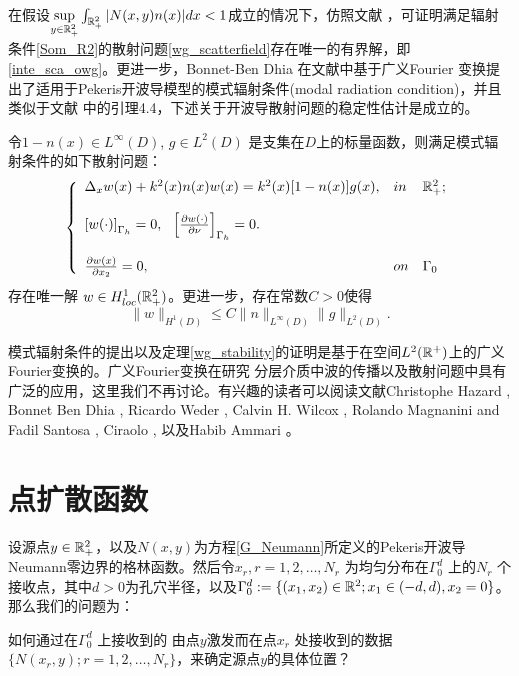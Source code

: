 在假设$\sup\limits_{y\in\mathbb{R}^2_+}\int_{\mathbb{R}^2_+}|N(x,y)n(x)|dx<1$成立的情况下，仿照文献\cite{Ciraolo2009A1,Ciraolo2009A2} ，可证明满足辐射条件\eqref{Som_R2}的散射问题\eqref{wg_scatterfield}存在唯一的有界解，即\eqref{inte_sca_owg}。更进一步，Bonnet-Ben Dhia 在文献\cite{Dhia2009DIFFRACTION}中基于广义Fourier 变换提出了适用于Pekeris开波导模型的模式辐射条件(modal radiation condition)，并且类似于文献\cite{Dhia2009DIFFRACTION} 中的引理4.4，下述关于开波导散射问题的稳定性估计是成立的。
\begin{theorem}\label{wg_stability}
令$1-n(x)\in L^{\infty}(D)$, $g\in L^2(D)$ 是支集在$D$上的标量函数，则满足模式辐射条件的如下散射问题：
\begin{eqnarray}\label{wg_scatter}
\left\{
\begin{array}{lll}
  \Delta_xw(x)+k^2(x)n(x)w(x)=k^2(x)[1-n(x)]g(x),&in& \mathbb{R}^2_+;\\
  & &\\
  \left[w(\cdot)\right]_{\Gamma_h}=0,\ \ \left[\frac{\partial w(\cdot)}{\partial\nu}\right]_{\Gamma_h}=0.\\
  & &\\
  \frac{\partial w(x)}{\partial x_2}=0,&on&\Gamma_0
\end{array}
\right.
\end{eqnarray}
存在唯一解 $w\in H^1_{loc}(\mathbb{R}^2_+)$。更进一步，存在常数$C>0$使得
\begin{equation}
  \|w\|_{H^1(D)}\leq C\|n\|_{L^{\infty}(D)}\|g\|_{L^2(D)}.
\end{equation}
\end{theorem}
\begin{remark}
模式辐射条件的提出以及定理\ref{wg_stability}的证明是基于在空间$L^2(\mathbb{R}^+)$上的广义Fourier变换的。广义Fourier变换在研究
分层介质中波的传播以及散射问题中具有广泛的应用，这里我们不再讨论。有兴趣的读者可以阅读文献Christophe Hazard \cite{Hazard2009A}, Bonnet Ben Dhia \cite{Dhia2009DIFFRACTION}, Ricardo Weder \cite{Weder1991Spectral}, Calvin H. Wilcox \cite{Wilcox1976Spectral,Wilcox1984Sound}, Rolando Magnanini and
Fadil Santosa \cite{Magnanini2000Wave}, Ciraolo \cite{Ciraolo2008NON,Ciraolo2009A1,Ciraolo2009A2}, 以及Habib Ammari \cite{Ammari2003Resonances,Ammari2005Reconstruction}。

\end{remark}
\section{点扩散函数}

设源点$y\in\mathbb{R}^2_+$，以及$N(x,y)$为方程\eqref{G_Neumann}所定义的Pekeris开波导Neumann零边界的格林函数。然后令$x_r,r=1,2,\ldots,N_r$ 为均匀分布在$\Gamma_0^d$ 上的$N_r$ 个接收点，其中$d>0$为孔穴半径，以及$\Gamma_0^d:=\{(x_1,x_2)\in\mathbb{R}^2;x_1\in(-d,d),x_2=0\}$。 那么我们的问题为：
\begin{question}\label{pro_psf}
  如何通过在$\Gamma_0^d$ 上接收到的
  由点$y$激发而在点$x_r$ 处接收到的数据$\{N(x_r,y);r=1,2,\ldots,N_r\}$，来确定源点$y$的具体位置？
\end{question}

